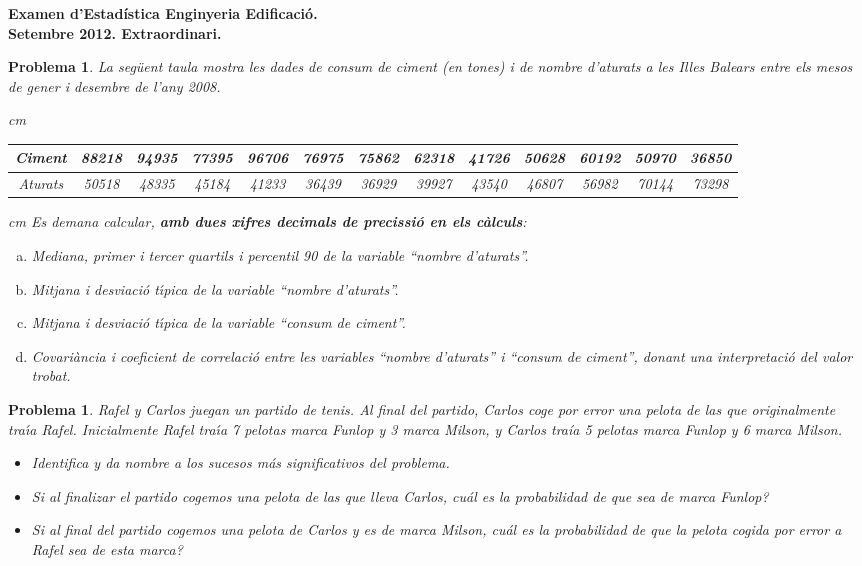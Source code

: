 \documentclass[a4paper,10pt]{article}
\newcounter{prbcont}
\newtheorem{problema}[prbcont]{Problema}
\begin{document}
\begin{center}
\textbf{{\large {Examen d'Estad\'istica Enginyeria Edificaci\'o. 
\\
Setembre 2012. Extraordinari.}}}
\end{center}

\vspace{0.3cm}

\begin{problema}
La seg\"uent taula mostra les dades de consum de ciment (en tones) i de nombre d'aturats a les Illes Balears
entre els mesos de gener i desembre de l'any 2008.

 cm
\begin{tabular}{|c|cccccccccccc|}
\hline
Ciment & 88218 & 94935 & 77395 & 96706 & 76975 & 75862 & 62318 & 41726 & 50628 & 60192 & 50970 & 36850 \\
\hline
Aturats & 50518 & 48335 & 45184 & 41233 & 36439 & 36929 & 39927 & 43540 & 46807 & 56982 & 70144 & 73298 \\
\hline
\end{tabular}

 cm
\noindent
Es demana calcular, \textbf{amb dues xifres decimals de precissi\'o en els c\`alculs}:

\begin{enumerate}[a)]
\item Mediana, primer i tercer quartils i percentil 90 de la variable ``nombre d'aturats''.
\item Mitjana i desviaci\'o t\'{\i}pica de la variable ``nombre d'aturats''.
\item Mitjana i desviaci\'o t\'{\i}pica de la variable ``consum de ciment''.
\item Covari\`ancia i coeficient de correlaci\'o entre les variables ``nombre d'aturats'' i ``consum de ciment'', donant una interpretaci\'o del valor trobat.
\end{enumerate}

\end{problema}

\begin{problema} 
Rafel y Carlos juegan un partido de tenis. 
Al final del partido, Carlos coge por error una pelota de las que originalmente tra\'{\i}a Rafel.
Inicialmente Rafel tra\'{\i}a 7 pelotas marca Funlop y 3 marca Milson,
y Carlos tra\'{i}a 5 pelotas marca Funlop y 6 marca Milson.
\begin{itemize}
\item [(a)] Identifica y da nombre a los sucesos m\'as significativos del problema. 
\item [(b)] Si al finalizar el partido cogemos una pelota de las que lleva Carlos, cu\'al es la
probabilidad de que sea de marca Funlop? 
\item [(c)] Si al final del partido cogemos una pelota de Carlos y es de marca Milson, 
cu\'al es la probabilidad de que la pelota cogida por error a Rafel 
sea de esta marca?
\end{itemize}
\end{problema}
\end{document}
